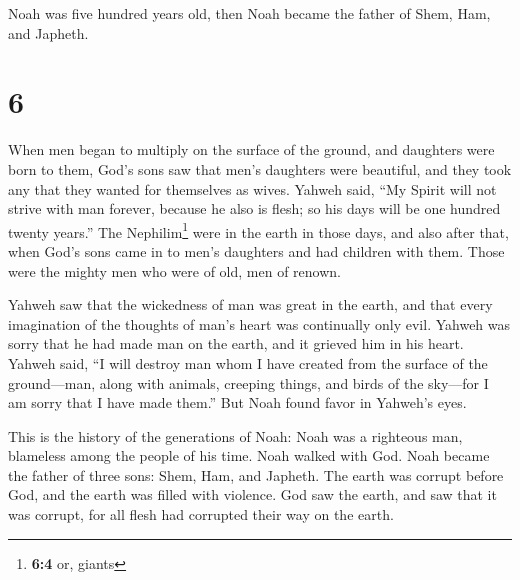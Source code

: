  Noah was five hundred years old, then Noah became the
father of Shem, Ham, and Japheth.

\hypertarget{section-5}{%
\section{6}\label{section-5}}

 When men began to multiply on the surface of the ground,
and daughters were born to them,  God's sons saw that
men's daughters were beautiful, and they took any that they wanted for
themselves as wives.  Yahweh said, ``My Spirit will not
strive with man forever, because he also is flesh; so his days will be
one hundred twenty years.''  The Nephilim\footnote{\textbf{6:4}
  or, giants} were in the earth in those days, and also after that, when
God's sons came in to men's daughters and had children with them. Those
were the mighty men who were of old, men of renown.

 Yahweh saw that the wickedness of man was great in the
earth, and that every imagination of the thoughts of man's heart was
continually only evil.  Yahweh was sorry that he had made
man on the earth, and it grieved him in his heart.  Yahweh
said, ``I will destroy man whom I have created from the surface of the
ground---man, along with animals, creeping things, and birds of the
sky---for I am sorry that I have made them.''  But Noah
found favor in Yahweh's eyes.

 This is the history of the generations of Noah: Noah was
a righteous man, blameless among the people of his time. Noah walked
with God.  Noah became the father of three sons: Shem,
Ham, and Japheth.  The earth was corrupt before God, and
the earth was filled with violence.  God saw the earth,
and saw that it was corrupt, for all flesh had corrupted their way on
the earth.

